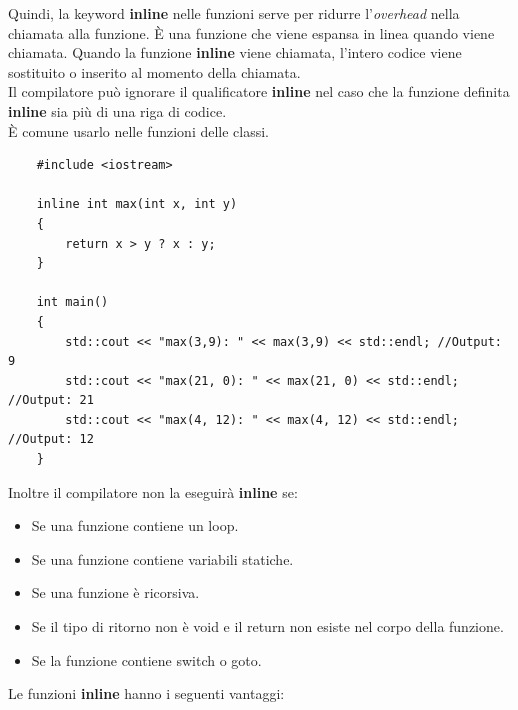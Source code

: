 \textsf{\small Quindi, la keyword \textbf{inline} nelle funzioni serve per ridurre l'\emph{overhead} nella chiamata alla funzione. È una funzione che viene espansa in linea quando viene chiamata. Quando la funzione \textbf{inline} viene chiamata, l'intero codice viene sostituito o inserito al momento della chiamata.} \\

\textsf{\small Il compilatore può ignorare il qualificatore \textbf{inline} nel caso che la funzione definita \textbf{inline} sia più di una riga di codice.} \\

\textsf{\small È comune usarlo nelle funzioni delle classi. } \\

\begin{lstlisting}
	#include <iostream>
	
	inline int max(int x, int y)
	{
		return x > y ? x : y;
	}

	int main()
	{
		std::cout << "max(3,9): " << max(3,9) << std::endl; //Output: 9
		std::cout << "max(21, 0): " << max(21, 0) << std::endl; //Output: 21
		std::cout << "max(4, 12): " << max(4, 12) << std::endl; //Output: 12
	}
\end{lstlisting}

\textsf{\small Inoltre il compilatore non la eseguirà \textbf{inline} se: } \\

\begin{itemize}
	\item \textsf{\small Se una funzione contiene un loop.}
	\item \textsf{\small Se una funzione contiene variabili statiche.}
	\item \textsf{\small Se una funzione è ricorsiva.}
	\item \textsf{\small Se il tipo di ritorno non è void e il return non esiste nel corpo della funzione.}
	\item \textsf{\small Se la funzione contiene switch o goto.}
\end{itemize}

\textsf{\small Le funzioni \textbf{inline} hanno i seguenti vantaggi: } \\


